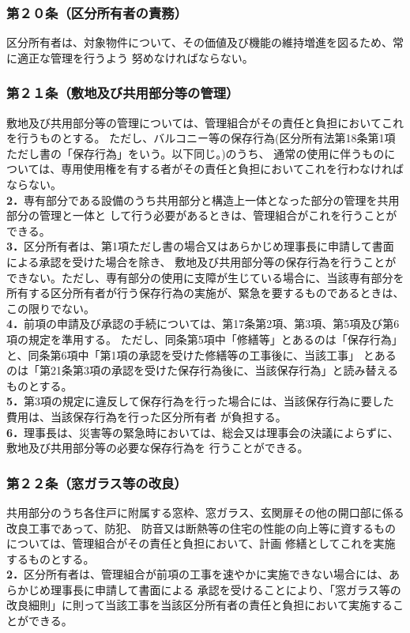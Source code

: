 \documentclass[12pt,uplatex,dvipdfmx]{jsarticle}
\begin{document}
\subsubsection*{第２０条（区分所有者の責務）}
区分所有者は、対象物件について、その価値及び機能の維持増進を図るため、常に適正な管理を行うよう
努めなければならない。
\subsubsection*{第２１条（敷地及び共用部分等の管理）}
敷地及び共用部分等の管理については、管理組合がその責任と負担においてこれを行うものとする。
ただし、バルコニー等の保存行為(区分所有法第18条第1項ただし書の「保存行為」をいう。以下同じ。)のうち、
通常の使用に伴うものについては、専用使用権を有する者がその責任と負担においてこれを行わなければならない。\\
\textbf{2．}専有部分である設備のうち共用部分と構造上一体となった部分の管理を共用部分の管理と一体と
して行う必要があるときは、管理組合がこれを行うことができる。\\
\textbf{3．}区分所有者は、第1項ただし書の場合又はあらかじめ理事長に申請して書面による承認を受けた場合を除き、
敷地及び共用部分等の保存行為を行うことができない。ただし、専有部分の使用に支障が生じている場合に、当該専有部分を
所有する区分所有者が行う保存行為の実施が、緊急を要するものであるときは、この限りでない。\\
\textbf{4．}前項の申請及び承認の手続については、第17条第2項、第3項、第5項及び第6項の規定を準用する。
ただし、同条第5項中「修繕等」とあるのは「保存行為」と、同条第6項中「第1項の承認を受けた修繕等の工事後に、当該工事」
とあるのは「第21条第3項の承認を受けた保存行為後に、当該保存行為」と読み替えるものとする。\\
\textbf{5．}第3項の規定に違反して保存行為を行った場合には、当該保存行為に要した費用は、当該保存行為を行った区分所有者
が負担する。\\
\textbf{6．}理事長は、災害等の緊急時においては、総会又は理事会の決議によらずに、敷地及び共用部分等の必要な保存行為を
行うことができる。\\

\subsubsection*{第２２条（窓ガラス等の改良）}
共用部分のうち各住戸に附属する窓枠、窓ガラス、玄関扉その他の開口部に係る改良工事であって、防犯、
防音又は断熱等の住宅の性能の向上等に資するものについては、管理組合がその責任と負担において、計画
修繕としてこれを実施するものとする。\\
\textbf{2．}区分所有者は、管理組合が前項の工事を速やかに実施できない場合には、あらかじめ理事長に申請して書面による
承認を受けることにより、「窓ガラス等の改良細則」に則って当該工事を当該区分所有者の責任と負担において実施することができる。\\
        
\end{document}
